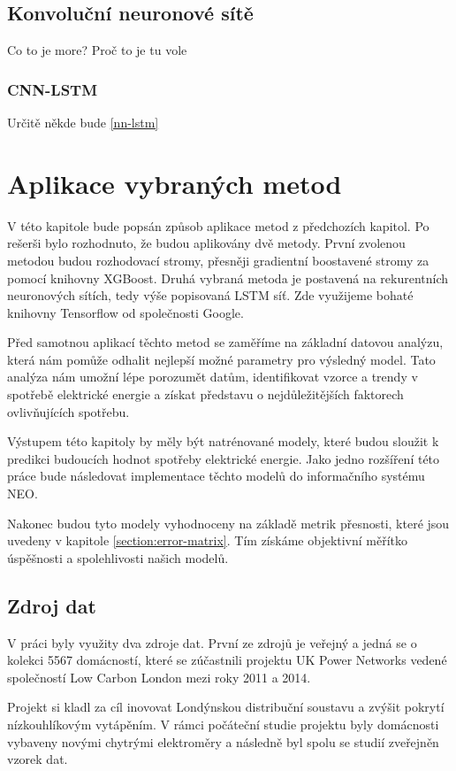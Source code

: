 \documentclass[FM,BP,fonts]{tulthesis}
\begin{document}
\newpage
\section{Konvoluční neuronové sítě}
Co to je more? Proč to je tu vole

\subsection{CNN-LSTM}
Určitě někde bude \ref{nn-lstm}

\chapter{Aplikace vybraných metod}
V této kapitole bude popsán způsob aplikace metod z předchozích kapitol. Po rešerši bylo rozhodnuto, že budou aplikovány dvě metody. První zvolenou metodou budou rozhodovací stromy, přesněji gradientní boostavené stromy za pomocí knihovny XGBoost.
Druhá vybraná metoda je postavená na rekurentních neuronových sítích, tedy výše popisovaná LSTM síť. Zde využijeme bohaté knihovny Tensorflow od společnosti Google.

Před samotnou aplikací těchto metod se zaměříme na základní datovou analýzu, která nám pomůže odhalit nejlepší možné parametry pro výsledný model. Tato analýza nám umožní lépe porozumět datům, identifikovat vzorce a trendy v spotřebě elektrické energie a získat představu o nejdůležitějších faktorech ovlivňujících spotřebu.

Výstupem této kapitoly by měly být natrénované modely, které budou sloužit k predikci budoucích hodnot spotřeby elektrické energie. Jako jedno rozšíření této práce bude následovat implementace těchto modelů do informačního systému NEO.  

Nakonec budou tyto modely vyhodnoceny na základě metrik přesnosti, které jsou uvedeny v kapitole \ref{section:error-matrix}. Tím získáme objektivní měřítko úspěšnosti a spolehlivosti našich modelů.



\section{Zdroj dat}
V práci byly využity dva zdroje dat. První ze zdrojů je veřejný a jedná se o kolekci 5567 domácností, které se zúčastnili projektu UK Power Networks vedené společností Low Carbon London mezi roky 2011 a 2014. 

Projekt si kladl za cíl inovovat Londýnskou distribuční soustavu a zvýšit pokrytí nízkouhlíkovým vytápěním. V rámci počáteční studie projektu byly domácnosti vybaveny novými chytrými elektroměry a následně byl spolu se studií zveřejněn vzorek dat. \cite{londondata}
\end{document}
